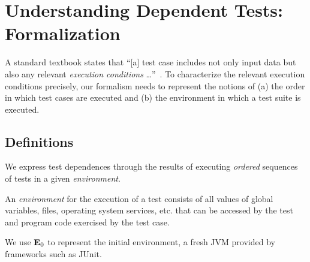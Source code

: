 
\section{Understanding Dependent Tests: Formalization}
\label{sec:formalism}

A standard textbook states that ``[a] test case includes not only input data but
also any relevant \emph{execution conditions}
\dots''~\cite[p.~152, emphasis added]{pezze-young:2007}.   
To characterize the relevant execution conditions precisely, 
our formalism needs to represent the notions of
(a) the order in which test cases are executed and (b) the environment in which a test suite is executed.  


\subsection{Definitions}
\label{sec:definitions}

We express test dependences through the results of executing
\emph{ordered} sequences of tests in a given \emph{environment}.


\begin{definition}[Environment]
An \emph{environment} \env for the execution of a test
consists of all values of global variables, files,
operating
system services, etc. that
can be accessed by the test and program code exercised by the test
case.
%
\end{definition}

We use $\mathbf{E}_0$ to represent the initial environment, a fresh
JVM provided by frameworks such as JUnit.



